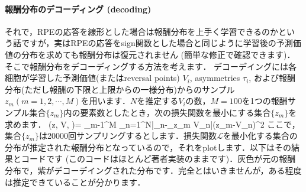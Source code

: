 \paragraph{報酬分布のデコーディング (decoding)}
それで，RPEの応答を線形とした場合は報酬分布を上手く学習できるのかという話ですが，実はRPEの応答をsign関数とした場合と同じように学習後の予測価値の分布を求めても報酬分布は復元されません (簡単な修正で確認できます)．そこで報酬分布をデコーディングする方法を考えます．
デコーデイングには各細胞が学習した予測価値(またはreversal points) $V_i$, asymmetries $\tau_i$, および報酬分布(ただし報酬の下限と上限からの一様分布)からのサンプル $z_m (m=1,2,\cdots,
M)$を用います．$N$を推定する$V_i$の数，$M=100$を1つの報酬サンプル集合$\{z_m\}$内の要素数としたとき，次の損失関数を最小にする集合$\{z_m\}$を求めます．  (z, V, \tau)= \sum_{m-1}^{M} \sum_{n=1}^{N}\left|\tau_{n}-_{z_{m} \leq
V_{n}}\right|\left(z_{m}-V_{n}\right)^{2}  ここで，集合$\{z_m\}$は20000回サンプリングするとします．損失関数$\mathcal{L}$を最小化する集合の分布が推定された報酬分布となっているので，それをplotします．以下はその結果とコードです
(このコードはほとんど著者実装のままです)．灰色が元の報酬分布で，紫がデコーデイングされた分布です．完全とはいきませんが，ある程度は推定できていることが分かります．
